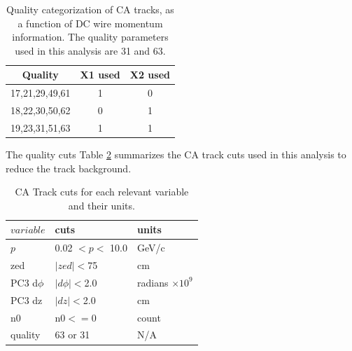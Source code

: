 \begin{table}[h!]
\caption{Quality categorization of CA tracks, as a function of DC wire momentum information. The quality parameters used in this analysis are 31 and 63.}
\begin{center}
    \begin{tabular}{ccc}
    \hline
    Quality & X1 used  & X2 used\\ \hline
    17,21,29,49,61 & 1 & 0 \\ \hline
    18,22,30,50,62 & 0 & 1 \\ \hline
    19,23,31,51,63 & 1 & 1 \\ \hline
    \end{tabular}
\end{center}
\label{tbl:dc_track_quality_x1}
\end{table}

The quality cuts Table \ref{tbl:cent_arm_trk_cut} summarizes the CA track cuts used in this analysis to reduce the track background. 
\begin{table}[h!]
\caption{CA Track cuts for each relevant variable and their units.}
\begin{center}
    \begin{tabular}{| l | l | l | }
    \hline
    $variable$ & cuts  & units\\ \hline
    $p$ & 0.02 $< p < $ 10.0  & GeV/c\\ \hline
    zed & $|zed| <$75  & cm \\ \hline
    PC3 d$\phi$ & $|d\phi|<$2.0  & radians $\times10^{9}$ \\ \hline
    PC3 dz & $|dz|<$2.0 & cm \\ \hline
    n0 & n0$<=$0 & count \\ \hline
    quality & 63 or 31& N/A \\ \hline
    \end{tabular}
\end{center}
\label{tbl:cent_arm_trk_cut}
\end{table}

